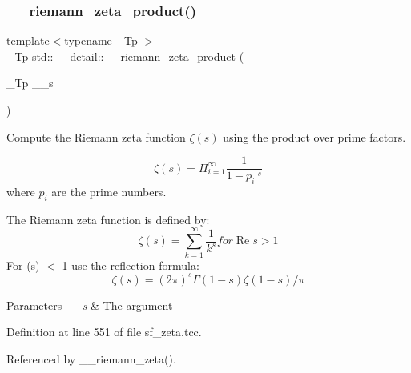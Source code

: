 \mbox{\label{namespacestd_1_1____detail_a917935f42a21af90b78a19ea81349129}} 
\subsubsection{\texorpdfstring{\+\_\+\+\_\+riemann\+\_\+zeta\+\_\+product()}{\_\_riemann\_zeta\_product()}}
{\footnotesize\ttfamily template$<$typename \+\_\+\+Tp $>$ \\
\+\_\+\+Tp std\+::\+\_\+\+\_\+detail\+::\+\_\+\+\_\+riemann\+\_\+zeta\+\_\+product (\begin{DoxyParamCaption}\item[{\+\_\+\+Tp}]{\+\_\+\+\_\+s }\end{DoxyParamCaption})}



Compute the Riemann zeta function $ \zeta(s) $ using the product over prime factors. 

\[ \zeta(s) = \Pi_{i=1}^\infty \frac{1}{1 - p_i^{-s}} \] where $ {p_i} $ are the prime numbers.

The Riemann zeta function is defined by\+: \[ \renewcommand\Re{\operatorname{Re}} \renewcommand\Im{\operatorname{Im}} \zeta(s) = \sum_{k=1}^{\infty} \frac{1}{k^{s}} for \Re{s} > 1 \] For (s) $<$ 1 use the reflection formula\+: \[ \zeta(s) = (2\pi)^s \Gamma(1-s) \zeta(1-s) / \pi \]


\begin{DoxyParams}{Parameters}
{\em \+\_\+\+\_\+s} & The argument \\
\hline
\end{DoxyParams}


Definition at line 551 of file sf\+\_\+zeta.\+tcc.



Referenced by \+\_\+\+\_\+riemann\+\_\+zeta().

\mbox{\label{namespacestd_1_1____detail_a417dc216465f02bb7ef055fa0e4e1f0b}} 

